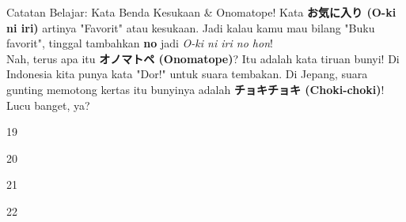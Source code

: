 \begin{lessonbox}{Catatan Belajar: Kata Benda Kesukaan \& Onomatope!}
    Kata \textbf{お気に入り (O-ki ni iri)} artinya "Favorit" atau kesukaan. Jadi kalau kamu mau bilang "Buku favorit", tinggal tambahkan \textbf{no} jadi \textit{O-ki ni iri no hon}! \\
    
    Nah, terus apa itu \textbf{オノマトペ (Onomatope)}? Itu adalah kata tiruan bunyi! Di Indonesia kita punya kata "Dor!" untuk suara tembakan. Di Jepang, suara gunting memotong kertas itu bunyinya adalah \textbf{チョキチョキ (Choki-choki)}! Lucu banget, ya?
\end{lessonbox}

\begin{convobox}{19}
    \noindent
      
     

    \vspace{1.5em}
\end{convobox}

\begin{convobox}{20}
    \noindent
      
      
      
     

    \vspace{1.5em}
\end{convobox}

\begin{convobox}{21}
    \noindent
      
     

    \vspace{1.5em}
\end{convobox}

\begin{convobox}{22}
    \noindent
      
      
      

    \vspace{1.5em}
\end{convobox}


